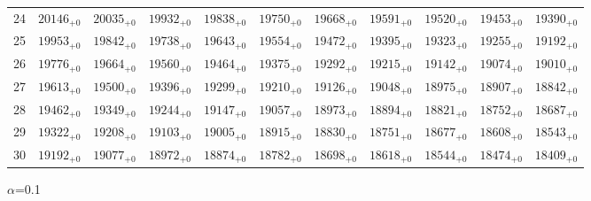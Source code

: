\documentclass[10pt, a4paper]{article}
\begin{document}
\begin{center}
\begin{tabular}{c || c c c c c | c c c c c}
        24 & \({20146}_{+0}\) & \({20035}_{+0}\) & \({19932}_{+0}\) & \({19838}_{+0}\) & \({19750}_{+0}\) & \({19668}_{+0}\) & \({19591}_{+0}\) & \({19520}_{+0}\) & \({19453}_{+0}\) & \({19390}_{+0}\)\\
        25 & \({19953}_{+0}\) & \({19842}_{+0}\) & \({19738}_{+0}\) & \({19643}_{+0}\) & \({19554}_{+0}\) & \({19472}_{+0}\) & \({19395}_{+0}\) & \({19323}_{+0}\) & \({19255}_{+0}\) & \({19192}_{+0}\)\\
        \hline
        26 & \({19776}_{+0}\) & \({19664}_{+0}\) & \({19560}_{+0}\) & \({19464}_{+0}\) & \({19375}_{+0}\) & \({19292}_{+0}\) & \({19215}_{+0}\) & \({19142}_{+0}\) & \({19074}_{+0}\) & \({19010}_{+0}\)\\
        27 & \({19613}_{+0}\) & \({19500}_{+0}\) & \({19396}_{+0}\) & \({19299}_{+0}\) & \({19210}_{+0}\) & \({19126}_{+0}\) & \({19048}_{+0}\) & \({18975}_{+0}\) & \({18907}_{+0}\) & \({18842}_{+0}\)\\
        28 & \({19462}_{+0}\) & \({19349}_{+0}\) & \({19244}_{+0}\) & \({19147}_{+0}\) & \({19057}_{+0}\) & \({18973}_{+0}\) & \({18894}_{+0}\) & \({18821}_{+0}\) & \({18752}_{+0}\) & \({18687}_{+0}\)\\
        29 & \({19322}_{+0}\) & \({19208}_{+0}\) & \({19103}_{+0}\) & \({19005}_{+0}\) & \({18915}_{+0}\) & \({18830}_{+0}\) & \({18751}_{+0}\) & \({18677}_{+0}\) & \({18608}_{+0}\) & \({18543}_{+0}\)\\
        30 & \({19192}_{+0}\) & \({19077}_{+0}\) & \({18972}_{+0}\) & \({18874}_{+0}\) & \({18782}_{+0}\) & \({18698}_{+0}\) & \({18618}_{+0}\) & \({18544}_{+0}\) & \({18474}_{+0}\) & \({18409}_{+0}\)\\
        \hline
    \end{tabular}
    \pagebreak

    \(\alpha\)=0.1


\end{center}
\end{document}
